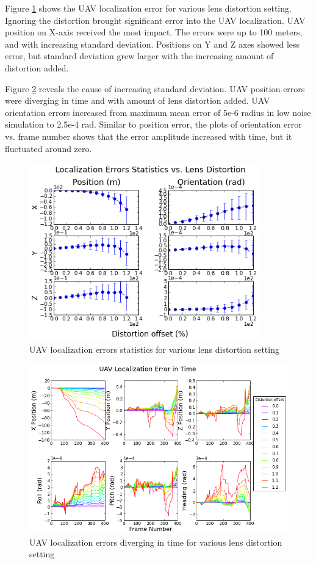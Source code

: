 Figure \ref{fig:simfig47} shows the UAV localization error for
various lens distortion setting. Ignoring the distortion brought
significant error into the UAV localization. UAV position on X-axis
received the most impact. The errors were up to 100 meters, and with
increasing standard deviation. Positions on Y and Z axes showed less
error, but standard deviation grew  larger with the increasing amount of
distortion added. 

Figure \ref{fig:simfig48} reveals the cause of increasing standard
deviation. UAV position errors were diverging in time and with amount
of lens distortion added. UAV orientation errors increased from
maximum mean error of 5e-6 radius in low noise simulation to 2.5e-4
rad. Similar to position error, the plots of orientation error vs.
frame number shows that the error amplitude increased with time,
but it fluctuated around zero.

\begin{figure}[h]
  \centering
  \includegraphics[width=10cm,keepaspectratio=true]{./Figures/SimulationFigures/Figure47.png}
  \caption{UAV localization errors statistics for various lens
    distortion setting}
  \label{fig:simfig47}
\end{figure}

\begin{figure}[h]
  \centering
  \includegraphics[width=14cm,keepaspectratio=true]{./Figures/SimulationFigures/Figure48.png}
  \caption{UAV localization errors diverging in time for various lens
    distortion setting}
  \label{fig:simfig48}
\end{figure}

